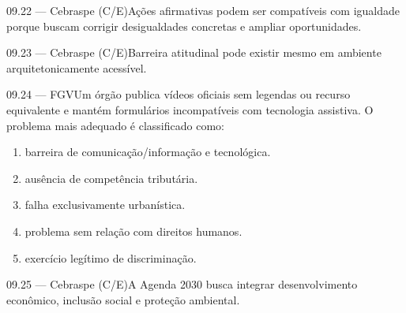 \begin{questao}{ 09.22 — Cebraspe (C/E)}Ações afirmativas podem ser compatíveis com igualdade porque buscam corrigir desigualdades concretas e ampliar oportunidades.\end{questao}
\begin{questao}{ 09.23 — Cebraspe (C/E)}Barreira atitudinal pode existir mesmo em ambiente arquitetonicamente acessível.\end{questao}
\begin{questao}{ 09.24 — FGV}Um órgão publica vídeos oficiais sem legendas ou recurso equivalente e mantém formulários incompatíveis com tecnologia assistiva. O problema mais adequado é classificado como:\begin{enumerate}[label=\Alph*)]\item barreira de comunicação/informação e tecnológica.\item ausência de competência tributária.\item falha exclusivamente urbanística.\item problema sem relação com direitos humanos.\item exercício legítimo de discriminação.\end{enumerate}\end{questao}
\begin{questao}{ 09.25 — Cebraspe (C/E)}A Agenda 2030 busca integrar desenvolvimento econômico, inclusão social e proteção ambiental.\end{questao}

